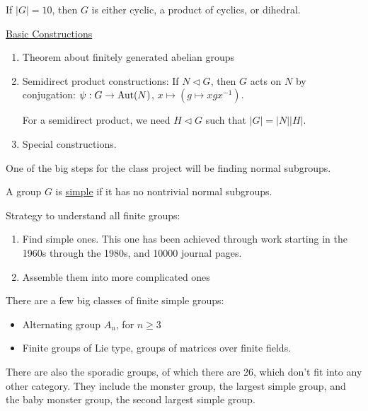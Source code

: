 \documentclass[x11names,reqno,14pt]{extarticle}
\begin{document}
If $|G| = 10$, then $G$ is either cyclic, a product of cyclics, or dihedral. 

\underline{Basic Constructions}
\begin{enumerate}
\item Theorem about finitely generated abelian groups
\item Semidirect product constructions: If $N\lhd G$, then $G$ acts on $N$ by conjugation: $\psi:G\to{\mathrm{Aut}}(N)$, $x\mapsto(g\mapsto xgx^{-1})$. 

For a semidirect product, we need $H \lhd G$ such that $|G| = |N||H|$. 
\item Special constructions.  
\end{enumerate}

One of the big steps for the class project will be finding normal subgroups. 

 A group $G$ is \underline{simple} if it has no nontrivial normal subgroups. 

Strategy to understand all finite groups: 
\begin{enumerate}
\item Find simple ones. This one has been achieved through work starting in the 1960s through the 1980s, and 10000 journal pages. 
\item Assemble them into more complicated ones
\end{enumerate}

There are a few big classes of finite simple groups: 
\begin{itemize}
\item Alternating group $A_n$, for $n \geq 3$
\item Finite groups of Lie type, groups of matrices over finite fields.  
\end{itemize}

There are also the sporadic groups, of which there are 26, which don't fit into any other category. They include the monster group, the largest simple group, and the baby monster group, the second largest simple group. 
\end{document}

